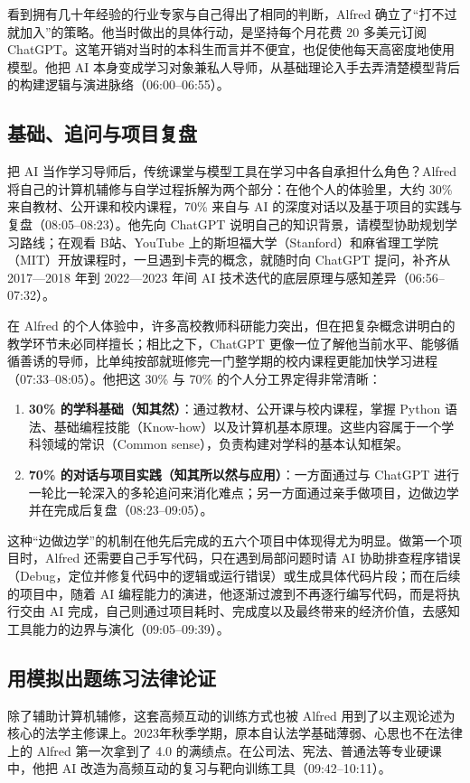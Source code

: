 \documentclass[UTF8,a4paper,11pt,fontset=fandol]{ctexart}
\begin{document}
看到拥有几十年经验的行业专家与自己得出了相同的判断，Alfred 确立了“打不过就加入”的策略。他当时做出的具体行动，是坚持每个月花费 20 多美元订阅 ChatGPT。这笔开销对当时的本科生而言并不便宜，也促使他每天高密度地使用模型。他把 AI 本身变成学习对象兼私人导师，从基础理论入手去弄清楚模型背后的构建逻辑与演进脉络（06:00–06:55）。

\subsection{基础、追问与项目复盘}
把 AI 当作学习导师后，传统课堂与模型工具在学习中各自承担什么角色？Alfred 将自己的计算机辅修与自学过程拆解为两个部分：在他个人的体验里，大约 30\% 来自教材、公开课和校内课程，70\% 来自与 AI 的深度对话以及基于项目的实践与复盘（08:05–08:23）。他先向 ChatGPT 说明自己的知识背景，请模型协助规划学习路线；在观看 B站、YouTube 上的斯坦福大学（Stanford）和麻省理工学院（MIT）开放课程时，一旦遇到卡壳的概念，就随时向 ChatGPT 提问，补齐从 2017—2018 年到 2022—2023 年间 AI 技术迭代的底层原理与感知差异（06:56–07:32）。

在 Alfred 的个人体验中，许多高校教师科研能力突出，但在把复杂概念讲明白的教学环节未必同样擅长；相比之下，ChatGPT 更像一位了解他当前水平、能够循循善诱的导师，比单纯按部就班修完一门整学期的校内课程更能加快学习进程（07:33–08:05）。他把这 30\% 与 70\% 的个人分工界定得非常清晰：

\begin{enumerate}
\item \textbf{30\% 的学科基础（知其然）}：通过教材、公开课与校内课程，掌握 Python 语法、基础编程技能（Know-how）以及计算机基本原理。这些内容属于一个学科领域的常识（Common sense），负责构建对学科的基本认知框架。
\item \textbf{70\% 的对话与项目实践（知其所以然与应用）}：一方面通过与 ChatGPT 进行一轮比一轮深入的多轮追问来消化难点；另一方面通过亲手做项目，边做边学并在完成后复盘（08:23–09:05）。
\end{enumerate}

这种“边做边学”的机制在他先后完成的五六个项目中体现得尤为明显。做第一个项目时，Alfred 还需要自己手写代码，只在遇到局部问题时请 AI 协助排查程序错误（Debug，定位并修复代码中的逻辑或运行错误）或生成具体代码片段；而在后续的项目中，随着 AI 编程能力的演进，他逐渐过渡到不再逐行编写代码，而是将执行交由 AI 完成，自己则通过项目耗时、完成度以及最终带来的经济价值，去感知工具能力的边界与演化（09:05–09:39）。

\subsection{用模拟出题练习法律论证}
除了辅助计算机辅修，这套高频互动的训练方式也被 Alfred 用到了以主观论述为核心的法学主修课上。2023年秋季学期，原本自认法学基础薄弱、心思也不在法律上的 Alfred 第一次拿到了 4.0 的满绩点。在公司法、宪法、普通法等专业硬课中，他把 AI 改造为高频互动的复习与靶向训练工具（09:42–10:11）。
\end{document}
